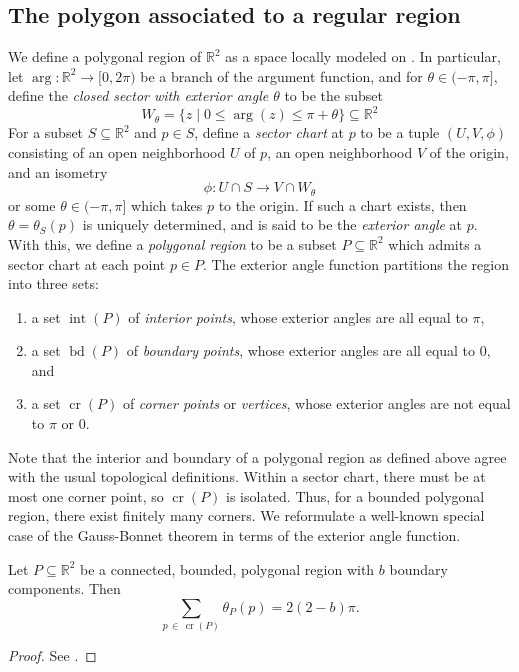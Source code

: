\subsection{The polygon associated to a regular region}
We define a polygonal region of $\mathbb{R}^2$ as a space locally modeled on . In particular, let $\arg \colon \mathbb{R}^2 \to [0, 2\pi)$ be a branch of the argument function, and for $\theta \in (-\pi, \pi]$, define the \emph{closed sector with exterior angle $\theta$} to be the subset
\begin{equation}
  W_{\theta} = \{z \mid 0 \leq \arg(z) \leq \pi + \theta \} \subseteq \mathbb{R}^2
\end{equation}
For a subset $S \subseteq \mathbb{R}^2$ and $p \in S$, define a \emph{sector chart} at $p$ to be a tuple $(U, V, \phi)$ consisting of an open neighborhood $U$ of $p$, an open neighborhood $V$ of the origin, and an isometry
\begin{equation}
  \phi \colon U \cap S \to V \cap W_\theta
\end{equation} 
or some $\theta \in (-\pi, \pi]$ which takes $p$ to the origin.
If such a chart exists, then $\theta = \theta_S(p)$ is uniquely determined, and is said to be the \emph{exterior angle} at $p$. With this, we define a \emph{polygonal region} to be a subset $P \subseteq \mathbb{R}^2$ which admits a sector chart at each point $p \in P$. The exterior angle function partitions the region into three sets:
\begin{enumerate}
  \item a set $\operatorname{int}(P)$ of  \emph{interior points}, whose exterior angles are all equal to $\pi$,
  \item a set $\operatorname{bd}(P)$ of \emph{boundary points}, whose exterior angles are all equal to $0$, and
  \item a set $\operatorname{cr}(P)$ of \emph{corner points} or \emph{vertices}, whose exterior angles are not equal to $\pi$ or $0$.
\end{enumerate}
Note that the interior and boundary of a polygonal region as defined above agree with the usual topological definitions. Within a sector chart, there must be at most one corner point, so $\operatorname{cr}(P)$ is isolated. Thus, for a bounded polygonal region, there exist finitely many corners. We reformulate a well-known special case of the Gauss-Bonnet theorem in terms of the exterior angle function.
\begin{theorem}\label{thm:gauss-bonnet}
  Let $P \subseteq \mathbb{R}^2$ be a connected, bounded, polygonal region with $b$ boundary components. Then
  \begin{equation}
    \sum_{p \, \in \, \operatorname{cr}(P)} \!\!\! \theta_P(p) = 2(2-b)\pi. 
  \end{equation}
\end{theorem}
\begin{proof}
  See \cite{docarmo1976}.
\end{proof}